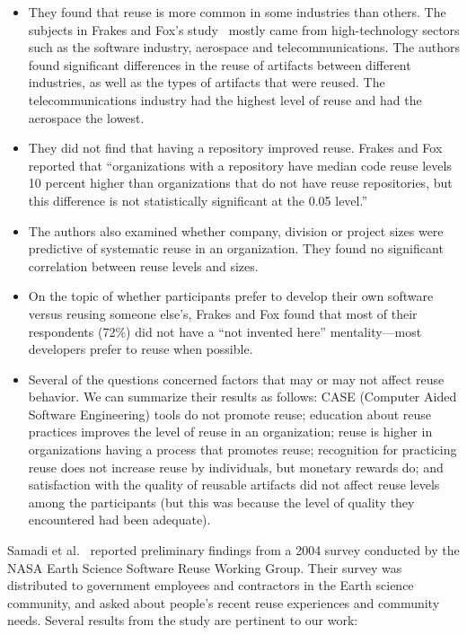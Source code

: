 \documentclass{casicswhitepaper}
\begin{document}
\begin{itemize}

\item They found that reuse is more common in some industries than others.  The subjects in Frakes and Fox's study~\cite{frakes1995sixteen} mostly came from high-technology sectors such as the software industry, aerospace and telecommunications.  The authors found significant differences in the reuse of artifacts between different industries, as well as the types of artifacts that were reused.  The telecommunications industry had the highest level of reuse and had the aerospace the lowest.

\item They did not find that having a repository improved reuse.  Frakes and Fox reported that ``organizations with a repository have median code reuse levels 10 percent higher than organizations that do not have reuse repositories, but this difference is not statistically significant at the 0.05 level.''

\item The authors also examined whether company, division or project sizes were predictive of systematic reuse in an organization.  They found no significant correlation between reuse levels and sizes.

\item On the topic of whether participants prefer to develop their own software versus reusing someone else's, Frakes and Fox found that most of their respondents (72\%) did not have a ``not invented here'' mentality---most developers prefer to reuse when possible.

\item Several of the questions concerned factors that may or may not affect reuse behavior.  We can summarize their results as follows: CASE (Computer Aided Software Engineering) tools do not promote reuse; education about reuse practices improves the level of reuse in an organization; reuse is higher in organizations having a process that promotes reuse;  recognition for practicing reuse does not increase reuse by individuals, but monetary rewards do; and satisfaction with the quality of reusable artifacts did not affect reuse levels among the participants (but this was because the level of quality they encountered had been adequate).

\end{itemize}

Samadi et al.~\cite{samadi_2004} reported preliminary findings from a 2004 survey conducted by the NASA Earth Science Software Reuse Working Group. Their survey was distributed to government employees and contractors in the Earth science community, and asked about people's recent reuse experiences and community needs.  Several results from the study are pertinent to our work:
\end{document}
